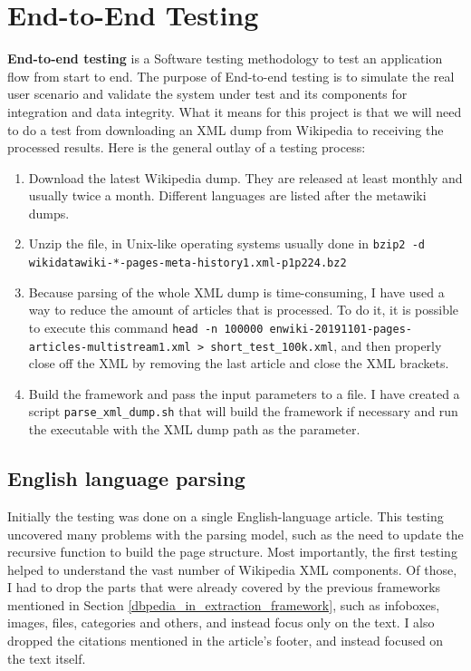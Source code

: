 \documentclass[thesis=M,english,hidelinks]{FITthesis}[2019/12/23]
\begin{document}
\section{End-to-End Testing}\label{end_to_end_testing}

\textbf{End-to-end testing} is a Software testing methodology to test an application flow from start to end. The purpose of End-to-end testing is to simulate the real user scenario and validate the system under test and its components for integration and data integrity. What it means for this project is that we will need to do a test from downloading an XML dump from Wikipedia to receiving the processed results. Here is the general outlay of a testing process:

\begin{enumerate}
	\item Download the latest Wikipedia dump\cite{wikimedia_downloads}. They are released at least monthly and usually twice a month. Different languages are listed after the metawiki dumps.
	\item Unzip the file, in Unix-like operating systems usually done in \lstinline{bzip2 -d wikidatawiki-*-pages-meta-history1.xml-p1p224.bz2} 
	\item [Optional] Because parsing of the whole XML dump is time-consuming, I have used a way to reduce the amount of articles that is processed. To do it, it is possible to execute this command \lstinline{head -n 100000 enwiki-20191101-pages-articles-multistream1.xml > short_test_100k.xml}, and then properly close off the XML by removing the last article and close the XML brackets.
	\item Build the framework and pass the input parameters to a file. I have created a script \lstinline{parse_xml_dump.sh} that will build the framework if necessary and run the executable with the XML dump path as the parameter.
\end{enumerate}

\subsection{English language parsing}

Initially the testing was done on a single English-language article. This testing uncovered many problems with the parsing model, such as the need to update the recursive function to build the page structure. Most importantly, the first testing helped to understand the vast number of Wikipedia XML components. Of those, I had to drop the parts that were already covered by the previous frameworks mentioned in Section \ref{dbpedia_in_extraction_framework}, such as infoboxes, images, files, categories and others, and instead focus only on the text. I also dropped the citations mentioned in the article's footer, and instead focused on the text itself.
\end{document}

